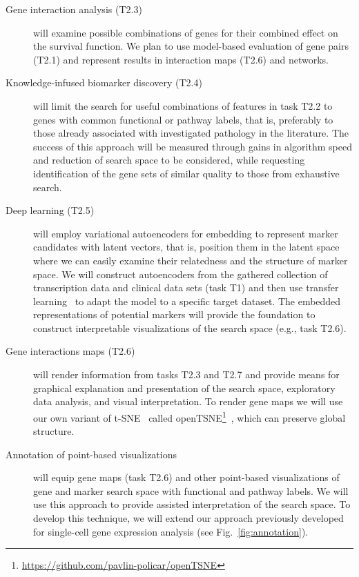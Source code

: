 \documentclass[11pt,a4paper]{article}
\newcommand{\myurl}[1]{\footnote{\url{#1}}}
\begin{document}
\begin{description}
\begin{description}
		\item[Gene interaction analysis (T2.3)] will examine possible combinations of genes for their combined effect on the survival function. We plan to use model-based evaluation of gene pairs (T2.1) and represent results in interaction maps (T2.6) and networks.
		\item[Knowledge-infused biomarker discovery (T2.4)] will limit the search for useful combinations of features in task T2.2 to genes with common functional or pathway labels, that is, preferably to those already associated with investigated pathology in the literature. The success of this approach will be measured through gains in algorithm speed and reduction of search space to be considered, while requesting identification of the gene sets of similar quality to those from exhaustive search.
		\item[Deep learning (T2.5)] will employ variational autoencoders for embedding to represent marker candidates with latent vectors, that is, position them in the latent space where we can easily examine their relatedness and the structure of marker space. We will construct autoencoders from the gathered collection of transcription data and clinical data sets (task T1) and then use transfer learning~\cite{Godec2019} to adapt the model to a specific target dataset. The embedded representations of potential markers will provide the foundation to construct interpretable visualizations of the search space (e.g., task T2.6).
		\item[Gene interactions maps (T2.6)] will render information from tasks T2.3 and T2.7 and provide means for graphical explanation and presentation of the search space, exploratory data analysis, and visual interpretation. To render gene maps we will use our own variant of t-SNE~\cite{vanDerMaaten2008} called openTSNE\myurl{https://github.com/pavlin-policar/openTSNE}~\cite{policar2019}, which can preserve global structure.
		\item[Annotation of point-based visualizations] will equip gene maps (task T2.6) and other point-based visualizations of gene and marker search space with functional and pathway labels. We will use this approach to provide assisted interpretation of the search space. To develop this technique, we will extend our approach previously developed for single-cell gene expression analysis (see Fig.~\ref{fig:annotation}).
	\end{description}


\end{description}
\end{document}
